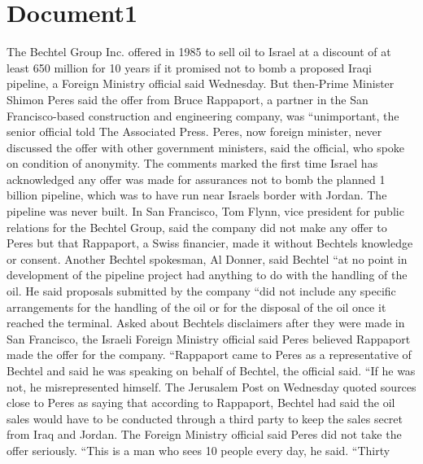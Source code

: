 \documentclass{article}
\begin{document}
\color[rgb]{0,0,0}\section{Document1}
\color[rgb]{0.6431372549019608,0.3764705882352941,0.9725490196078431}The Bechtel Group Inc. offered in 1985 to sell oil to \color[rgb]{0.7450980392156863,0.5411764705882353,0.4235294117647059}Israel at a \color[rgb]{0.6431372549019608,0.3764705882352941,0.9725490196078431}discount of at least 650 million for 10 years if it promised not to bomb a proposed Iraqi pipeline, a Foreign Ministry official said Wednesday. But then-Prime Minister Shimon Peres said the offer from Bruce Rappaport, a partner in the San Francisco-based construction and engineering company, was ``unimportant, the senior official told The Associated Press. Peres, now foreign minister, never discussed the offer with other government \color[rgb]{0.7450980392156863,0.5411764705882353,0.4235294117647059}ministers, said the \color[rgb]{0.6431372549019608,0.3764705882352941,0.9725490196078431}official, who spoke on condition of anonymity. The comments marked the first time \color[rgb]{0.7450980392156863,0.5411764705882353,0.4235294117647059}Israel has \color[rgb]{0.6431372549019608,0.3764705882352941,0.9725490196078431}acknowledged any offer was made for assurances not to bomb the planned 1 billion pipeline, which was to have run near Israels border with Jordan. The pipeline was never built. In San Francisco, Tom Flynn, vice president for public relations for the Bechtel Group, said the company did not make any offer to Peres but that Rappaport, a Swiss financier, made it without Bechtels knowledge or consent. Another Bechtel spokesman, Al Donner, said Bechtel ``at no point in development of the pipeline project had anything to do with the handling of the oil. He said proposals submitted by the company ``did not include any specific arrangements for the handling of the oil or for the disposal of the oil once it reached the terminal. Asked about Bechtels disclaimers after they were made in San Francisco, the \color[rgb]{0.7450980392156863,0.5411764705882353,0.4235294117647059}Israeli Foreign \color[rgb]{0.6431372549019608,0.3764705882352941,0.9725490196078431}Ministry official said Peres believed Rappaport made the offer for the company. ``Rappaport came to Peres as a representative of Bechtel and said he was speaking on behalf of Bechtel, the official said. ``If he was not, he misrepresented himself. The \color[rgb]{0.7450980392156863,0.5411764705882353,0.4235294117647059}Jerusalem \color[rgb]{0.6431372549019608,0.3764705882352941,0.9725490196078431}Post on Wednesday quoted sources close to Peres as \color[rgb]{0.7450980392156863,0.5411764705882353,0.4235294117647059}saying that \color[rgb]{0.6431372549019608,0.3764705882352941,0.9725490196078431}according to Rappaport, Bechtel had said the oil sales would have to be conducted through a third party to keep the sales secret from \color[rgb]{0.48627450980392156,0.5411764705882353,0.12549019607843137}Iraq and \color[rgb]{0.6431372549019608,0.3764705882352941,0.9725490196078431}Jordan. The Foreign Ministry official said Peres did not take the offer seriously. ``This is a man who sees 10 people every day, he said. ``Thirty 
\end{document}
